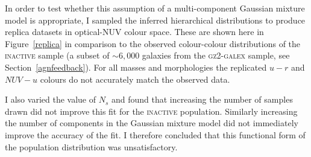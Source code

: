 

In order to test whether this assumption of a multi-component Gaussian mixture model is appropriate, I sampled the inferred hierarchical distributions to produce replica datasets in optical-NUV colour space. These are shown here in Figure~\ref{replica}  in comparison to the observed colour-colour distributions of the \textsc{inactive} sample (a subset of $\sim6,000$ galaxies from the \textsc{gz2-galex} sample, see Section~\ref{agnfeedback}). For all masses and morphologies the replicated $u-r$ and $NUV-u$ colours do not accurately match the observed data. 


I also varied the value of $N_s$ and found that increasing the number of samples drawn did not improve this fit for the \textsc{inactive} population. Similarly increasing the number of components in the Gaussian mixture model did not immediately improve the accuracy of the fit.  I therefore concluded that this functional form of the population distribution was unsatisfactory. %

